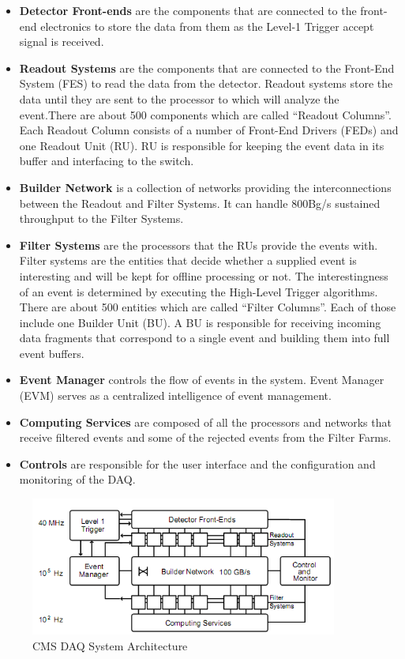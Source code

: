 \begin{itemize}
	\item \textbf{Detector Front-ends} are the components that are connected to the front-end electronics to store the data from them as the Level-1 Trigger accept signal is received. 
	\item \textbf{Readout Systems} are the components that are connected to the Front-End System (FES) to read the data from the detector. Readout systems store the data until they are sent to the processor to which will analyze the event.There are about 500 components which are called ``Readout Columns''. Each Readout Column consists of a number of Front-End Drivers (FEDs) and one Readout Unit (RU). RU is responsible for keeping the event data in its buffer and interfacing to the switch.
	\item \textbf{Builder Network} is a collection of networks providing the interconnections between the Readout and Filter Systems. It can handle 800Bg/s sustained throughput to the Filter Systems.
	\item \textbf{Filter Systems} are the processors that the RUs provide the events with. Filter systems are the entities that decide whether a supplied event is interesting and will be kept for offline processing or not. The interestingness of an event is determined by executing the High-Level Trigger algorithms. There are about 500 entities which are called ``Filter Columns''. Each of those include one Builder Unit (BU). A BU is responsible for receiving incoming data fragments that correspond to a single event and building them into full event buffers. 
	\item \textbf{Event Manager} controls the flow of events in the system. Event Manager (EVM) serves as a centralized intelligence of event management.
	\item \textbf{Computing Services} are composed of all the processors and networks that receive filtered events and some of the rejected events from the Filter Farms.
	\item \textbf{Controls} are responsible for the user interface and the configuration and monitoring of the DAQ.
\end{itemize}

\begin{figure}
	\centering
		\includegraphics[width=0.90\textwidth]{figures/xdaqarch.png}
	\caption{CMS DAQ System Architecture}
	\label{fig:xdaqarch}
\end{figure}

